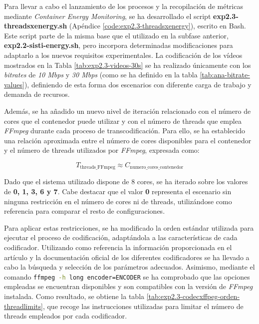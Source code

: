 Para llevar a cabo el lanzamiento de los procesos y la recopilación de métricas mediante \textit{Container Energy Monitoring}, se ha desarrollado el script \textbf{exp2.3-threadsxenergy.sh} (Apéndice \ref{code:exp2.3-threadsxenergy}), escrito en Bash. Este script parte de la misma base que el utilizado en la subfase anterior, \textbf{exp2.2-sisti-energy.sh}, pero incorpora determinadas modificaciones para adaptarlo a los nuevos requisitos experimentales. La codificación de los vídeos mostrados en la Tabla \ref{tab:exp2.3-videos-30s} se ha realizado únicamente con los \textit{bitrates} de \textit{10 Mbps} y \textit{30 Mbps} (como se ha definido en la tabla \ref{tab:ana-bitrate-values}), definiendo de esta forma dos escenarios con diferente carga de trabajo y demanda de recursos.

Además, se ha añadido un nuevo nivel de iteración relacionado con el número de cores que el contenedor puede utilizar y con el número de threads que emplea \textit{FFmpeg} durante cada proceso de transcodificación. Para ello, se ha establecido una relación aproximada entre el número de cores disponibles para el contenedor y el número de threads utilizados por \textit{FFmpeg}, expresada como:

\[T_{\text{threads\_FFmpeg}} \approx C_{\text{numero\_cores\_contenedor}}\]

Dado que el sistema utilizado dispone de 8 cores, se ha iterado sobre los valores de \textbf{0, 1, 3, 6 y 7}. Cabe destacar que el valor \textbf{0} representa el escenario sin ninguna restricción en el número de cores ni de threads, utilizándose como referencia para comparar el resto de configuraciones.

Para aplicar estas restricciones, se ha modificado la orden estándar utilizada para ejecutar el proceso de codificación, adaptándola a las características de cada codificador. Utilizando como referencia la información proporcionada en el artículo \cite{threads-number-encoding} y la documentación oficial de los diferentes codificadores \cite{ffmpeg-oficial-documentation} \cite{x265-documentation-threading} se ha llevado a cabo la búsqueda y selección de los parámetros adecuados. Asimismo, mediante el comando \lstinline[language=sh]{ffmpeg -h long encoder=ENCODER} se ha comprobado que las opciones empleadas se encuentran disponibles y son compatibles con la versión de \textit{FFmpeg} instalada. Como resultado, se obtiene la tabla \ref{tab:exp2.3-codecxffpeg-orden-threadlimits}, que recoge las instrucciones utilizadas para limitar el número de threads empleados por cada codificador.

